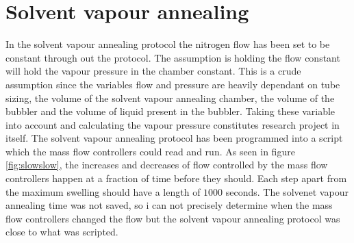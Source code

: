 \documentclass[MasterThesisMain.tex]{subfiles}
\begin{document}
\section{Solvent vapour annealing}

In the solvent vapour annealing protocol the nitrogen flow has been set to be constant through out the protocol. The assumption is holding the flow constant will hold the vapour pressure in the chamber constant. This is a crude assumption since the variables flow and pressure are heavily dependant on tube sizing, the volume of the solvent vapour annealing chamber, the volume of the bubbler and the volume of liquid present in the bubbler. Taking these variable into account and calculating the vapour pressure constitutes research project in itself. The solvent vapour annealing protocol has been programmed into a script which the mass flow controllers could read and run. As seen in figure \ref{fig:slowslow}, the increases and decreases of flow controlled by the mass flow controllers happen at a fraction of time before they should. Each step apart from the maximum swelling should have a length of $1000$ seconds. The solvenet vapour annealing time was not saved, so i can not precisely determine when the mass flow controllers changed the flow but the solvent vapour annealing protocol was close to what was scripted.   
\end{document}
